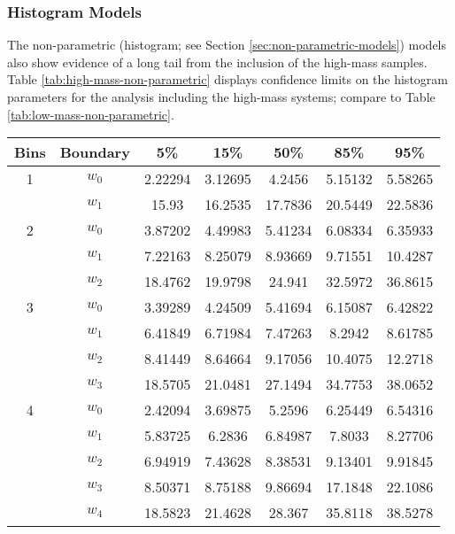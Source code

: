 \documentclass[preprint]{aastex}
\begin{document}
\subsubsection{Histogram Models}

The non-parametric (histogram; see Section
\ref{sec:non-parametric-models}) models also show evidence of a long
tail from the inclusion of the high-mass samples.  Table
\ref{tab:high-mass-non-parametric} displays confidence limits on the
histogram parameters for the analysis including the high-mass
systems; compare to Table \ref{tab:low-mass-non-parametric}.

\begin{table}
  \begin{center}
    \begin{tabular}{|c|c|c|c|c|c|c|}
      \hline
      Bins & Boundary & 5\% & 15\% & 50\% & 85\% & 95\% \\
      \hline \hline
      \hline
      1 & $w_0$ & 2.22294 & 3.12695 & 4.2456 & 5.15132 & 5.58265 \\
      \hline
      & $w_1$ & 15.93 & 16.2535 & 17.7836 & 20.5449 & 22.5836 \\
      \hline \hline
      2 & $w_0$ & 3.87202 & 4.49983 & 5.41234 & 6.08334 & 6.35933 \\
      \hline
      & $w_1$ & 7.22163 & 8.25079 & 8.93669 & 9.71551 & 10.4287 \\
      \hline
      & $w_2$ & 18.4762 & 19.9798 & 24.941 & 32.5972 & 36.8615 \\
      \hline \hline
      3 & $w_0$ & 3.39289 & 4.24509 & 5.41694 & 6.15087 & 6.42822 \\
      \hline
      & $w_1$ & 6.41849 & 6.71984 & 7.47263 & 8.2942 & 8.61785 \\
      \hline
      & $w_2$ & 8.41449 & 8.64664 & 9.17056 & 10.4075 & 12.2718 \\
      \hline
      & $w_3$ & 18.5705 & 21.0481 & 27.1494 & 34.7753 & 38.0652 \\
      \hline \hline
      4 & $w_0$ & 2.42094 & 3.69875 & 5.2596 & 6.25449 & 6.54316 \\
      \hline
      & $w_1$ & 5.83725 & 6.2836 & 6.84987 & 7.8033 & 8.27706 \\
      \hline
      & $w_2$ & 6.94919 & 7.43628 & 8.38531 & 9.13401 & 9.91845 \\
      \hline
      & $w_3$ & 8.50371 & 8.75188 & 9.86694 & 17.1848 & 22.1086 \\
      \hline
      & $w_4$ & 18.5823 & 21.4628 & 28.367 & 35.8118 & 38.5278 \\      

\end{tabular}
\end{center}
\end{table}
\end{document}
